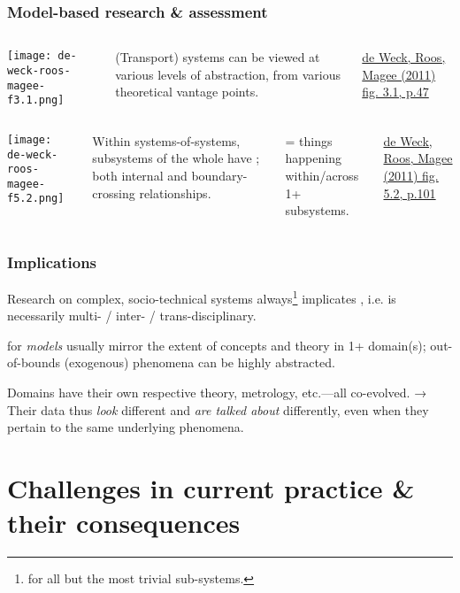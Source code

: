 \documentclass[14pt,aspectratio=169]{beamer}
\begin{document}
\begin{frame}[allowframebreaks]
\frametitle{Model-based research \& assessment}

\begin{columns}
\texttt{[image: de-weck-roos-magee-f3.1.png]}

(Transport) systems can be viewed at various levels of abstraction, from various theoretical vantage points.

\medskip

{\small \href{https://mitpress.mit.edu/books/engineering-systems}{de Weck, Roos, Magee (2011) fig. 3.1, p.47}}
\end{columns}

\begin{columns}
\texttt{[image: de-weck-roos-magee-f5.2.png]}

Within systems-of-systems, subsystems of the whole have ; both internal and boundary-crossing relationships.

\medskip
{} = things happening within/across 1+ subsystems.

\medskip
{\small \href{https://mitpress.mit.edu/books/engineering-systems}{de Weck, Roos, Magee (2011) fig. 5.2, p.101}}
\end{columns}

\end{frame}

\begin{frame}
\frametitle{Implications}

Research on complex, socio-technical systems always\footnote{for all but the most trivial sub-systems.} implicates , i.e. is necessarily multi- / inter- / trans-disciplinary.

\bigskip
\pause
{} for \emph{models} usually mirror the extent of concepts and theory in 1+ domain(s); out-of-bounds (exogenous) phenomena can be highly abstracted.

\bigskip
\pause
Domains have their own respective theory, metrology, etc.—all co-evolved.
\pause → Their data thus \emph{look} different and \emph{are talked about} differently, even when they pertain to the same underlying phenomena.

\end{frame}

\section{Challenges in current practice \& their consequences}
\end{document}
